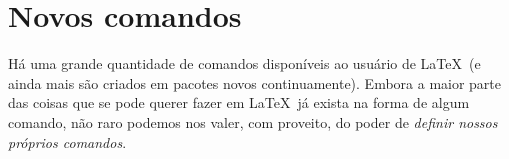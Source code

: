 \section{Novos comandos}\label{sec:comandos}

Há uma grande quantidade de comandos disponíveis ao usuário de
\LaTeX\ (e ainda mais são criados em pacotes novos
continuamente). Embora a maior parte das coisas que se pode querer
fazer em \LaTeX\ já exista na forma de algum comando, não raro podemos
nos valer, com proveito, do poder de \emph{definir nossos
  próprios comandos}. 




